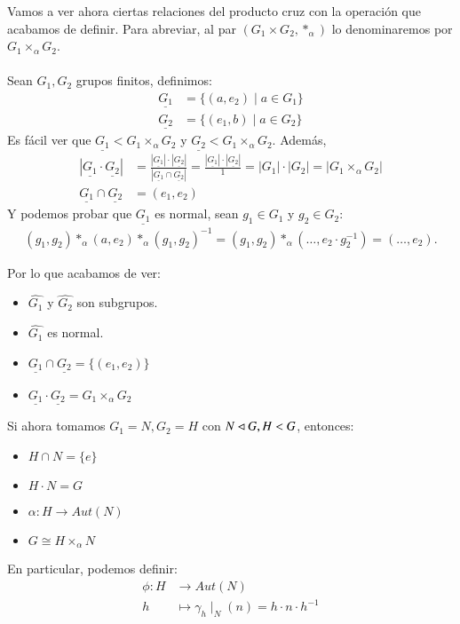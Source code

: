 Vamos a ver ahora ciertas relaciones del producto cruz con la operación que acabamos de definir. Para abreviar, al par $(G_1 \times G_2, \ast_\alpha)$ lo denominaremos por $G_1 \times_\alpha G_2$.\\\\
Sean $G_1, G_2$ grupos finitos, definimos:
\begin{align*}
\underline{G_1} &= \{(a, e_2) \mid a \in G_1\}\\
\underline{G_2} &= \{(e_1, b) \mid a \in G_2\}
\end{align*}
Es fácil ver que $\underline{G_1} < G_1 \times_\alpha G_2$ y $\underline{G_2} < G_1 \times_\alpha G_2$. Además,
\begin{align*}
|\underline{G_1}\cdot \underline{G_2}| &= \frac{|\underline{G_1}|\cdot |\underline{G_2}|}{|\underline{G_1} \cap \underline{G_2}|} = \frac{|\underline{G_1}|\cdot |\underline{G_2}|}{1} = |G_1|\cdot |G_2| = |G_1 \times_\alpha G_2|\\
\underline{G_1} \cap \underline{G_2} &= {(e_1, e_2)}
\end{align*}
Y podemos probar que $\underline{G_1}$ es normal, sean $g_1 \in G_1$ y $g_2 \in G_2$:
\begin{align*}
(g_1, g_2) \ast_\alpha (a, e_2) \ast_\alpha (g_1, g_2)^{-1} = (g_1,g_2)\ast_\alpha(\ldots, e_2\cdot g_2^{-1}) = (\ldots, e_2).
\end{align*}
\begin{cor}
	\label{cor:propiedadesgrupdirecto}
	Por lo que acabamos de ver:
	\begin{itemize}
		\item $\hat{G_1}$ y $\hat{G_2}$ son subgrupos.
		\item $\hat{G_1}$ es normal.
		\item $\underline{G_1} \cap \underline{G_2} = \{(e_1,e_2)\}$
		\item $\underline{G_1} \cdot \underline{G_2} = G_1 \times_\alpha G_2$
	\end{itemize}
	Si ahora tomamos $G_1 = N, G_2 = H$ con $N \lhd G, H < G$, entonces:
	\begin{itemize}
		\item $H \cap N = \{e\}$
		\item $H \cdot N = G$
		\item $\alpha: H \longrightarrow Aut(N)$
		\item $G \cong H \times_\alpha N$
	\end{itemize}
\end{cor}
En particular, podemos definir:
\begin{align*}
\phi : H &\longrightarrow Aut(N)\\
h &\longmapsto \gamma_h\mid_N(n) = h\cdot n\cdot h^{-1}
\end{align*}
